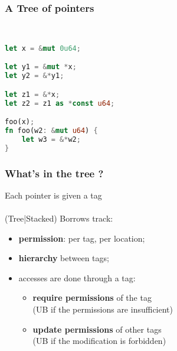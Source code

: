 \begin{frame}[fragile]
    \frametitle{A Tree of pointers}
    \begin{minipage}{0.45\textwidth}
        \begin{block}{}
        \end{block}
    \end{minipage}
    ~\ ~\
    \begin{minipage}{0.45\textwidth}
        \begin{block}{}
            \begin{lstlisting}[language=rust]
let x = &mut 0u64;

let y1 = &mut *x;
let y2 = &*y1;

let z1 = &*x;
let z2 = z1 as *const u64;

foo(x);
fn foo(w2: &mut u64) {
    let w3 = &*w2;
}

            \end{lstlisting}
        \end{block}
    \end{minipage}
\end{frame}

\begin{frame}
    \frametitle{What's in the tree ?}
    Each pointer is given a tag~\\~\\

    (Tree|Stacked) Borrows track:
    \begin{itemize}
        \item \textbf{permission}: per tag, per location;
        \item \textbf{hierarchy} between tags;
        \item accesses are done through a tag:
            \begin{itemize}
                \item \textbf{require permissions} of the tag\\
                    (UB if the permissions are insufficient)
                \item \textbf{update permissions} of other tags\\
                    (UB if the modification is forbidden)
            \end{itemize}
    \end{itemize}
\end{frame}

